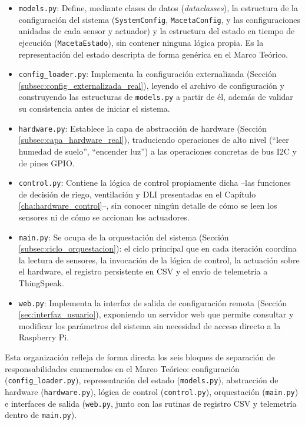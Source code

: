 \begin{itemize}
    \item \texttt{models.py}: Define, mediante clases de datos (\textit{dataclasses}), la estructura de la configuración del sistema (\texttt{SystemConfig}, \texttt{MacetaConfig}, y las configuraciones anidadas de cada sensor y actuador) y la estructura del estado en tiempo de ejecución (\texttt{MacetaEstado}), sin contener ninguna lógica propia. Es la representación del estado descripta de forma genérica en el Marco Teórico.
    \item \texttt{config\_loader.py}: Implementa la configuración externalizada (Sección \ref{subsec:config_externalizada_real}), leyendo el archivo de configuración y construyendo las estructuras de \texttt{models.py} a partir de él, además de validar su consistencia antes de iniciar el sistema.
    \item \texttt{hardware.py}: Establece la capa de abstracción de hardware (Sección \ref{subsec:capa_hardware_real}), traduciendo operaciones de alto nivel (``leer humedad de suelo'', ``encender luz'') a las operaciones concretas de bus I2C y de pines GPIO.
    \item \texttt{control.py}: Contiene la lógica de control propiamente dicha --las funciones de decisión de riego, ventilación y DLI presentadas en el Capítulo \ref{cha:hardware_control}--, sin conocer ningún detalle de cómo se leen los sensores ni de cómo se accionan los actuadores.
    \item \texttt{main.py}: Se ocupa de la orquestación del sistema (Sección \ref{subsec:ciclo_orquestacion}): el ciclo principal que en cada iteración coordina la lectura de sensores, la invocación de la lógica de control, la actuación sobre el hardware, el registro persistente en CSV y el envío de telemetría a ThingSpeak.
    \item \texttt{web.py}: Implementa la interfaz de salida de configuración remota (Sección \ref{sec:interfaz_usuario}), exponiendo un servidor web que permite consultar y modificar los parámetros del sistema sin necesidad de acceso directo a la Raspberry Pi.
\end{itemize}

Esta organización refleja de forma directa los seis bloques de separación de responsabilidades enumerados en el Marco Teórico: configuración (\texttt{config\_loader.py}), representación del estado (\texttt{models.py}), abstracción de hardware (\texttt{hardware.py}), lógica de control (\texttt{control.py}), orquestación (\texttt{main.py}) e interfaces de salida (\texttt{web.py}, junto con las rutinas de registro CSV y telemetría dentro de \texttt{main.py}).

